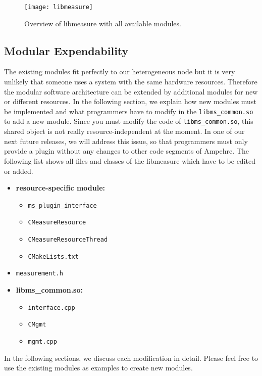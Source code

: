 \begin{figure}
\begin{center}
\texttt{[image: libmeasure]} 
\caption{Overview of libmeasure with all available modules.}
\label{fig:libmeasure_overview}
\end{center}
\end{figure}

\pagebreak

\subsection{Modular Expendability}
The existing modules fit perfectly to our heterogeneous node but it is very unlikely that someone uses a system with the same hardware resources. Therefore the modular software architecture can be extended by additional modules for new or different resources. In the following section, we explain how new modules must be implemented and what programmers have to modify in the \texttt{libms\_common.so} to add a new module. Since you must modify the code of \texttt{libms\_common.so}, this shared object is not really resource-independent at the moment. In one of our next future releases, we will address this issue, so that programmers must only provide a plugin without any changes to other code segments of Ampehre.  The following list shows all files and classes of the libmeasure which have to be edited or added.

\begin{itemize}
	\item \textbf{resource-specific module:}
	\begin{itemize}
		\item \texttt{ms\_plugin\_interface}
		\item \texttt{CMeasureResource}
		\item \texttt{CMeasureResourceThread}
		\item \texttt{CMakeLists.txt}
	\end{itemize}
	\item \texttt{measurement.h}
	\item \textbf{libms\_common.so:}
	\begin{itemize}
		\item \texttt{interface.cpp}
		\item \texttt{CMgmt}
		\item \texttt{mgmt.cpp} 
	\end{itemize}
\end{itemize}
In the following sections, we discuss each modification in detail. Please feel free to use the existing modules as examples to create new modules.

